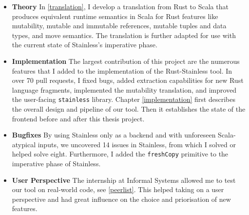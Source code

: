 \begin{itemize}

\item \textbf{Theory} In \autoref{translation}, I develop a translation from
Rust to Scala that produces equivalent runtime semantics in Scala for Rust
features like mutability, mutable and immutable references, mutable tuples and
data types, and move semantics. The translation is further adapted for use with
the current state of Stainless's imperative phase.

\item \textbf{Implementation} The largest contribution of this project are the
numerous features that I added  to the implementation of the Rust-Stainless
tool. In over 70 pull requests, I fixed bugs, added extraction capabilities for
new Rust language fragments, implemented the mutability translation, and
improved the user-facing \lstinline!stainless! library. Chapter
\ref{implementation} first describes the overall design and pipeline of our
tool. Then it establishes the state of the frontend before and after this thesis
project.

\item \textbf{Bugfixes} By using Stainless only as a backend and with unforeseen
Scala-atypical inputs, we uncovered 14 issues in Stainless, from which I solved
or helped solve eight. Furthermore, I added the \lstinline!freshCopy! primitive
to the imperative phase of Stainless.

\item \textbf{User Perspective} The internship at Informal Systems allowed me to
test our tool on real-world code, see \autoref{peerlist}. This helped taking on
a user perspective and had great influence on the choice and priorisation of new
features.

\end{itemize}
